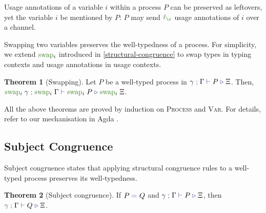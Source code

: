 \documentclass[a4paper,UKenglish,cleveref,autoref,thm-restate,authorcolumns]{lipics-v2019}
\theoremstyle{definition}
\newtheorem{nitheorem}{Theorem}
\newcommand{\type}[1]{\textcolor{BlueViolet}{\operatorname{#1}}}
\newcommand{\func}[1]{\textcolor{OliveGreen}{\operatorname{#1}}}
\newcommand{\lz}{\func{\ell_{\o}}}
\newcommand{\types}[4]{#1 \; \type{;} \; #2 \; \type{\vdash} \; #3 \; \type{\triangleright} \; #4}
\newcommand{\eq}[1]{\; \type{=}_{#1} \;}
\begin{document}
\begin{remark}
  Usage annotations of a variable $i$ within a process $P$ can be preserved as leftovers, yet the variable $i$ be mentioned by $P$: $P$ may send $\lz$ usage annotations of $i$ over a channel.
\end{remark}

Swapping two variables preserves the well-typedness of a process.
For simplicity, we extend $\func{swap}_i$ introduced in \autoref{structural-congruence} to swap types in typing contexts and usage annotations in usage contexts.
\begin{nitheorem}[Swapping]
  \label{thm:swapping}
  Let $P$ be a well-typed process in $\types{\gamma}{\Gamma}{P}{\Xi}$.
  Then, $\types{\func{swap}_i \; \gamma}{\func{swap}_i \; \Gamma}{\func{swap}_i \; P}{\func{swap}_i \; \Xi}$.
\end{nitheorem}

All the above theorems are proved by induction on \textsc{Process} and \textsc{Var}.
For details, refer to our mechanisation in Agda \cite{Zalakain2020Agda}.


\subsection{Subject Congruence}
\label{subject-congruence}

Subject congruence states that applying structural congruence rules to a well-typed process preserves its well-typedness.
\begin{nitheorem}[Subject congruence]
  \label{thm:subject-congruence}
  If $P \eq{} Q$ and $\types{\gamma}{\Gamma}{P}{\Xi}$, then $\types{\gamma}{\Gamma}{Q}{\Xi}$.
\end{nitheorem}
\end{document}
